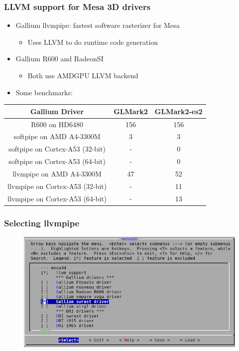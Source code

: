 \documentclass{smilebeamer}
\begin{document}
\begin{frame}
\frametitle{LLVM support for Mesa 3D drivers}
\begin{itemize}
  \item Gallium llvmpipe: fastest software rasterizer for Mesa
  \begin{itemize}
    \item Uses LLVM to do runtime code generation
  \end{itemize}
  \item Gallium R600 and RadeonSI
  \begin{itemize}
    \item Both use AMDGPU LLVM backend
  \end{itemize}
    \item Some benchmarks:
\end{itemize}
\centering
  \begin{tabular}{c|c|c}
  \textbf{Gallium Driver} & \textbf{GLMark2} & \textbf{GLMark2-es2} \\
  \hline
  R600 on HD6480 & 156 & 156 \\
  softpipe on AMD A4-3300M & 3 & 3 \\
  softpipe on Cortex-A53 (32-bit) & - & 0 \\
  softpipe on Cortex-A53 (64-bit) & - & 0 \\
  llvmpipe on AMD A4-3300M & 47 & 52 \\
  llvmpipe on Cortex-A53 (32-bit) & - & 11 \\
  llvmpipe on Cortex-A53 (64-bit) & - & 13 \\
  \end{tabular}
\end{frame}


\begin{frame}
\frametitle{Selecting llvmpipe}
\begin{figure}
\includegraphics[width=1\linewidth]{img/mesa_swrast.png}
\end{figure}
\end{frame}
\end{document}
